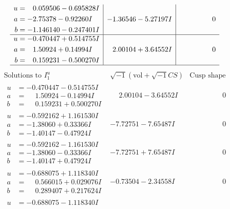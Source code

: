 \documentclass[1p]{elsarticle_modified}
\theoremstyle{definition}
\newcommand{\I}{\sqrt{-1}}
\begin{document}
$$\begin{array}{c|c|c}
\begin{aligned}
u &= \phantom{-}0.059506 - 0.695828 I \\
a &= -2.75378 - 0.92260 I \\
b &= -1.146140 - 0.247401 I\end{aligned}
 & -1.36546 - 5.27197 I & \phantom{-0.000000 } 0 \\ \hline\begin{aligned}
u &= -0.470447 + 0.514755 I \\
a &= \phantom{-}1.50924 + 0.14994 I \\
b &= \phantom{-}0.159231 - 0.500270 I\end{aligned}
 & \phantom{-}2.00104 + 3.64552 I & \phantom{-0.000000 } 0\\
 \hline 
 \end{array}$$\newpage$$\begin{array}{c|c|c}  
\text{Solutions to }I^u_{1}& \I (\text{vol} + \sqrt{-1}CS) & \text{Cusp shape}\\
 \hline 
\begin{aligned}
u &= -0.470447 - 0.514755 I \\
a &= \phantom{-}1.50924 - 0.14994 I \\
b &= \phantom{-}0.159231 + 0.500270 I\end{aligned}
 & \phantom{-}2.00104 - 3.64552 I & \phantom{-0.000000 } 0 \\ \hline\begin{aligned}
u &= -0.592162 + 1.161530 I \\
a &= -1.38060 + 0.33366 I \\
b &= -1.40147 - 0.47924 I\end{aligned}
 & -7.72751 - 7.65487 I & \phantom{-0.000000 } 0 \\ \hline\begin{aligned}
u &= -0.592162 - 1.161530 I \\
a &= -1.38060 - 0.33366 I \\
b &= -1.40147 + 0.47924 I\end{aligned}
 & -7.72751 + 7.65487 I & \phantom{-0.000000 } 0 \\ \hline\begin{aligned}
u &= -0.688075 + 1.118340 I \\
a &= \phantom{-}0.566015 + 0.029076 I \\
b &= \phantom{-}0.289407 + 0.217624 I\end{aligned}
 & -0.73504 - 2.34558 I & \phantom{-0.000000 } 0 \\ \hline\begin{aligned}
u &= -0.688075 - 1.118340 I \\

\end{aligned}
\end{array}$$
\end{document}
